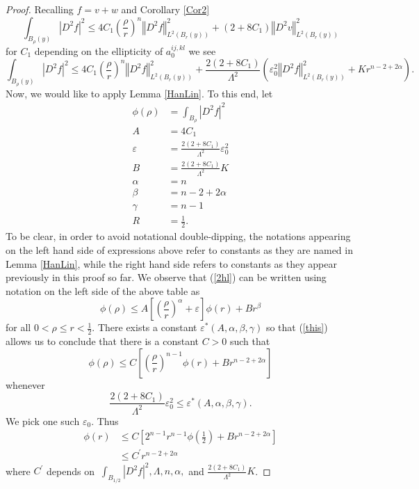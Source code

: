 \documentclass[12pt,leqno]{amsart}%
\theoremstyle{plain}
\numberwithin{equation}{section}
\theoremstyle{definition}
\begin{document}
\begin{proof}
Recalling $f=v+w$ and Corollary \ref{Cor2}
\[
\int_{B_{\rho}(y)}\left\vert D^{2}f\right\vert ^{2}\leq4C_{1}\left(
\frac{\rho}{r}\right)  ^{n}\left\Vert D^{2}f\right\Vert _{L^{2}(B_{r}(y))}%
^{2}+\left(  2+8C_{1}\right)  \left\Vert D^{2}v\right\Vert _{L^{2}(B_{r}%
(y))}^{2}%
\]
for $C_{1}$ depending on the ellipticity of $a_{0}^{ij,kl}$ we see
\begin{equation}
\int_{B_{\rho}(y)}\left\vert D^{2}f\right\vert ^{2}\leq4C_{1}\left(
\frac{\rho}{r}\right)  ^{n}\left\Vert D^{2}f\right\Vert _{L^{2}(B_{r}(y))}%
^{2}+\frac{2\left(  2+8C_{1}\right)  }{\Lambda^{2}}\left(  \varepsilon_{0}^{2}
\left\Vert D^{2}f\right\Vert _{L^{2}(B_{r}(y))}^{2}+Kr^{n-2+2\alpha}\right)  .
\label{2hl}%
\end{equation}
Now, we would like to apply Lemma \ref{HanLin}. To this end, let
\begin{align*}
\phi(\rho)  &  =\int_{B_{\rho}}\left\vert D^{2}f\right\vert ^{2}\\
A  &  =4C_{1}\\
\varepsilon &  =\frac{2\left(  2+8C_{1}\right)  }{\Lambda^{2}}\varepsilon
_{0}^{2}\\
B  &  =\frac{2\left(  2+8C_{1}\right)  }{\Lambda^{2}}K\\
\alpha &  =n\\
\beta &  =n-2+2\alpha\\
\gamma &  =n-1\\
R  &  =\frac{1}{2}.
\end{align*}
To be clear, in order to avoid notational double-dipping, the notations
appearing on the left hand side of expressions above refer to constants as
they are named in Lemma \ref{HanLin}, while the right hand side refers to
constants as they appear previously in this proof so far. We observe that
(\ref{2hl}) can be written using notation on the left side of the above table
as
\begin{equation}
\phi(\rho)\leq A\left[  \left(  \frac{\rho}{r}\right)  ^{\alpha}%
+\varepsilon\right]  \phi(r)+Br^{\beta} \label{this}%
\end{equation}
for all $0<\rho\leq r<\frac{1}{2}.$ There exists a constant $\varepsilon
^{\ast}\left(  A,\alpha,\beta,\gamma\right)  $ so that (\ref{this}) allows us
to conclude that there is a constant $C>0$ such that
\[
\phi(\rho)\leq C\left[  \left(  \frac{\rho}{r}\right)  ^{n-1}\phi
(r)+Br^{n-2+2\alpha}\right]
\]
whenever
\begin{equation}
\frac{2\left(  2+8C_{1}\right)  }{\Lambda^{2}}\varepsilon_{0}^{2}%
\leq\varepsilon^{\ast}\left(  A,\alpha,\beta,\gamma\right)  .
\label{eps_0_def}%
\end{equation}
We pick one such $\varepsilon_{0}$. Thus
\begin{align*}
\phi(r)  &  \leq C\left[  2^{n-1}r^{n-1}\phi(\frac{1}{2})+Br^{n-2+2\alpha
}\right] \\
&  \leq C^{\prime}r^{n-2+2\alpha}%
\end{align*}
where $C^{\prime}$ depends on $\ \int_{B_{1/2}}\left\vert D^{2}f\right\vert
^{2},\Lambda,n,\alpha,$ and $\frac{2\left(  2+8C_{1}\right)  }{\Lambda^{2}}K$.


\end{proof}
\end{document}
